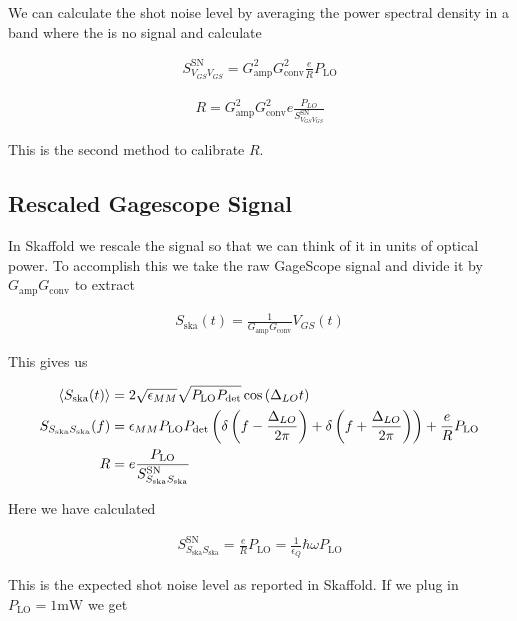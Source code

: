 \documentclass[12pt]{article}
\begin{document}
We can calculate the shot noise level by averaging the power spectral density in a band where the is no signal and calculate

\begin{align}
S_{V_{GS}V_{GS}}^{\text{SN}} = G_{\text{amp}}^2 G_{\text{conv}}^2 \frac{e}{R} P_{\text{LO}}
\end{align}

\begin{align}
R = G_{\text{amp}}^2 G_{\text{conv}}^2 e \frac{P_{LO}}{S_{V_{GS}V_{GS}}^{\text{SN}}}
\end{align}

This is the second method to calibrate $R$.

\subsection{Rescaled Gagescope Signal}

In Skaffold we rescale the signal so that we can think of it in units of optical power. To accomplish this we take the raw GageScope signal and divide it by $G_{\text{amp}}G_{\text{conv}}$ to extract

\begin{align}
S_{\text{ska}}(t) = \frac{1}{G_{\text{amp}}G_{\text{conv}}} V_{GS}(t)
\end{align}

This gives us

\begin{align}
\Braket{S_{\text{ska}}(t)} &= 2 \sqrt{\epsilon_{MM}} \sqrt{P_{\text{LO}}P_{\text{det}}} \cos\left(\Delta_{LO} t\right)\\
S_{S_{\text{ska}}S_{\text{ska}}}(f) &= \epsilon_{MM}P_{\text{LO}}P_{\text{det}}\left(\delta\left(f-\frac{\Delta_{LO}}{2\pi}\right) + \delta\left(f+\frac{\Delta_{LO}}{2\pi}\right)\right) + \frac{e}{R}P_{\text{LO}}\\
R &= e \frac{P_{\text{LO}}}{S_{S_{\text{ska}}S_{\text{ska}}}^{\text{SN}}}
\end{align}

Here we have calculated

\begin{align}
S_{S_{\text{ska}}S_{\text{ska}}}^{\text{SN}} = \frac{e}{R}P_{\text{LO}} = \frac{1}{\epsilon_Q} \hbar \omega P_{\text{LO}}
\end{align}

This is the expected shot noise level as reported in Skaffold. If we plug in $P_{\text{LO}} = 1 \text{mW}$ we get
\end{document}
